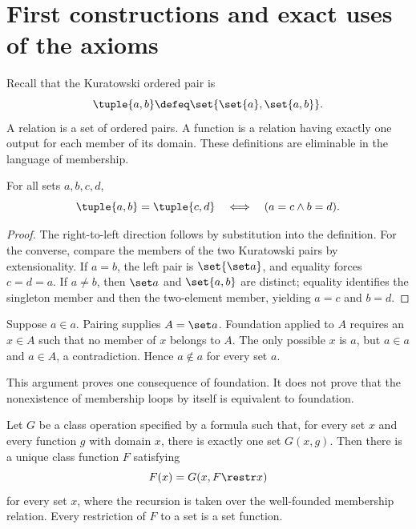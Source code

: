 \section{First constructions and exact uses of the axioms}
\label{sec:zf-zfc-02}

Recall that the Kuratowski ordered pair is
\[
  \tuple{a,b}\defeq\set{\set{a},\set{a,b}}.
\]
A relation is a set of ordered pairs.  A function is a relation having exactly
one output for each member of its domain.  These definitions are eliminable in
the language of membership.

\begin{lemma}
For all sets \(a,b,c,d\),
\[
  \tuple{a,b}=\tuple{c,d}
  \quad\Longleftrightarrow\quad
  (a=c\land b=d).
\]
\end{lemma}

\begin{proof}
The right-to-left direction follows by substitution into the definition.  For
the converse, compare the members of the two Kuratowski pairs by
extensionality.  If \(a=b\), the left pair is \(\set{\set a}\), and equality
forces \(c=d=a\).  If \(a\ne b\), then \(\set a\) and \(\set{a,b}\) are
distinct; equality identifies the singleton member and then the two-element
member, yielding \(a=c\) and \(b=d\).
\end{proof}

\begin{example}
Suppose \(a\in a\).  Pairing supplies \(A=\set a\).  Foundation applied to
\(A\) requires an \(x\in A\) such that no member of \(x\) belongs to \(A\).
The only possible \(x\) is \(a\), but \(a\in a\) and \(a\in A\), a
contradiction.  Hence \(a\notin a\) for every set \(a\).

This argument proves one consequence of foundation.  It does not prove that
the nonexistence of membership loops by itself is equivalent to foundation.
\end{example}

\begin{theorem}
Let \(G\) be a class operation specified by a formula such that, for every set
\(x\) and every function \(g\) with domain \(x\), there is exactly one set
\(G(x,g)\).  Then there is a unique class function \(F\) satisfying
\[
  F(x)=G(x,F\restr x)
\]
for every set \(x\), where the recursion is taken over the well-founded
membership relation.  Every restriction of \(F\) to a set is a set function.
\end{theorem}

